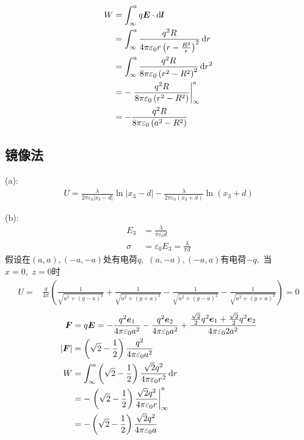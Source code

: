 \begin{align*}
    W&=\int_{\infty}^{a}q\boldsymbol{E}\cdot\dif \boldsymbol{l}\\
    &=\int_{\infty}^{a}\frac{q^2R}{4\pi\varepsilon_0r\left(r-\frac{R^2}{r}\right)^2}\dif r\\
    &=\int_{\infty}^{a}\frac{q^2R}{8\pi\varepsilon_0\left(r^2-{R^2}\right)^2}\dif r^2\\
    &=-\left.\frac{q^2R}{8\pi\varepsilon_0\left(r^2-{R^2}\right)}\right|_{\infty}^{a}\\
    &=-\frac{q^2R}{8\pi\varepsilon_0\left(a^2-{R^2}\right)}
\end{align*}
\subsection{镜像法}
(a):
\begin{align*}
    U=\frac{\lambda}{2\pi\varepsilon_0|x_3-d|}\ln\left|x_3-d\right|
    -\frac{\lambda}{2\pi\varepsilon_0(x_3+d)}\ln\left(x_3+d\right)
\end{align*}

(b):
\begin{align*}
    E_3&=\frac{\lambda}{\pi\varepsilon_0d}\\
    \sigma&=\varepsilon_0E_3=\frac{\lambda}{\pi d}
\end{align*}
假设在$(a,a),(-a,-a)$处有电荷$q$, \,$(a,-a),(-a,a)$有电荷$-q$, \,当$x=0,\, \,z=0$时
\begin{align*}
    U
    =&\frac{q}{4\pi}\left(\frac{1}{\sqrt{a^2+(y-a)^2}}
    +\frac{1}{\sqrt{a^2+(y+a)^2}}
    -\frac{1}{\sqrt{a^2+(y-a)^2}}
    -\frac{1}{\sqrt{a^2+(y+a)^2}}\right)=0
\end{align*}
\begin{align*}
    \boldsymbol{F}&=q\boldsymbol{E}=-\frac{q^2\boldsymbol e_1}{4\pi\varepsilon_0 a^2}
    -\frac{q^2\boldsymbol e_2}{4\pi\varepsilon_0 a^2}
    +\frac{\frac{\sqrt{2}}{2}q^2\boldsymbol e_1+\frac{\sqrt{2}}{2}q^2\boldsymbol e_2}{4\pi\varepsilon_0 2a^2}\\
    \left|\boldsymbol{F}\right|&=\left(\sqrt{2}-\frac{1}{2}\right)\frac{q^2}{4\pi\varepsilon_0 a^2}\\
    W&=\int_{\infty}^{a}\left(\sqrt{2}-\frac{1}{2}\right)\frac{\sqrt{2}q^2}{4\pi\varepsilon_0 r^2}\dif r\\
    &=-\left.\left(\sqrt{2}-\frac{1}{2}\right)\frac{\sqrt{2}q^2}{4\pi\varepsilon_0 r}\right|_{\infty}^{a}\\
    &=-\left(\sqrt{2}-\frac{1}{2}\right)\frac{\sqrt{2}q^2}{4\pi\varepsilon_0 a}
\end{align*}

